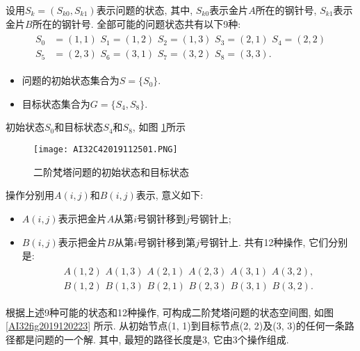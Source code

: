 \begin{result}
设用$S_k=(S_{k0}, S_{k1})$表示问题的状态, 其中, $S_{k0}$表示金片$A$所在的钢针号, $S_{k1}$表示金片$B$所在的钢针号.
全部可能的问题状态共有以下9种:
\begin{align}
    \begin{array}{ll}
    S_0&=(1, 1)\,\,   S_1=(1, 2)\,\,     S_2=(1, 3)\,\,    S_3=(2, 1)\,\,    S_4=(2, 2)\\
    S_5&=(2, 3)\,\,   S_6=(3, 1) \,\,    S_7=(3, 2) \,\,   S_8=(3, 3).
    \end{array}
\end{align}

\begin{itemize}
    \item 问题的初始状态集合为$S=\{S_0\}$.
    \item 目标状态集合为$G=\{S_4, S_8\}$.
\end{itemize}
初始状态$S_0$和目标状态$S_4$和$S_8$, 如图 \ref{AI32fig2019120222}所示
\begin{figure}[H]
    \centering
    \texttt{[image: AI32C42019112501.PNG]}
    \caption{二阶梵塔问题的初始状态和目标状态}
    \label{AI32fig2019120222}
\end{figure}
操作分别用$A(i, j)$和$B(i, j)$表示, 意义如下:
\begin{itemize}
\item  $A(i, j)$表示把金片$A$从第$i$号钢针移到$j$号钢针上;
\item  $B(i, j)$表示把金片$B$从第$i$号钢针移到第$j$号钢针上. 共有12种操作, 它们分别是:
\begin{align}
\begin{array}{ll}
      A(1, 2)\,\,   A(1, 3) \,\,    A(2, 1)\,\,     A(2, 3) \,\,    A(3, 1) \,\,    A(3, 2),\\
      B(1, 2)\,\,     B(1, 3) \,\,     B(2, 1)\,\,     B(2, 3)  \,\,   B(3, 1)  \,\,    B(3, 2).
\end{array}
\end{align}
\end{itemize}
根据上述9种可能的状态和12种操作, 可构成二阶梵塔问题的状态空间图, 如图 \ref{AI32fig2019120223} 所示.
从初始节点(1, 1)到目标节点(2, 2)及(3, 3)的任何一条路径都是问题的一个解. 其中, 最短的路径长度是3, 它由3个操作组成.
\end{result}

